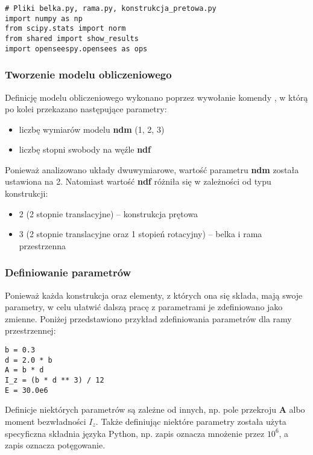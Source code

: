 \begin{lstlisting}
# Pliki belka.py, rama.py, konstrukcja_pretowa.py
import numpy as np
from scipy.stats import norm
from shared import show_results
import openseespy.opensees as ops
\end{lstlisting}

\subsubsection{Tworzenie modelu obliczeniowego}

Definicję modelu obliczeniowego wykonano poprzez wywołanie komendy
, w którą po kolei przekazano następujące parametry:

\begin{itemize}
    \item liczbę wymiarów modelu \textbf{ndm} (1, 2, 3)
    \item liczbę stopni swobody na węźle \textbf{ndf}
\end{itemize}

Ponieważ analizowano układy dwuwymiarowe, wartość parametru \textbf{ndm} została ustawiona na 2.
Natomiast wartość \textbf{ndf} różniła się w zależności od typu konstrukcji:

\begin{itemize}
    \item 2 (2 stopnie translacyjne) – konstrukcja prętowa
    \item 3 (2 stopnie translacyjne oraz 1 stopień rotacyjny) – belka i rama przestrzenna
\end{itemize}

\subsubsection{Definiowanie parametrów}

Ponieważ każda konstrukcja oraz elementy, z których ona się składa, mają swoje parametry, w celu ułatwić dalszą pracę z parametrami
je zdefiniowano jako zmienne.
Poniżej przedstawiono przykład zdefiniowania parametrów dla ramy przestrzennej:

\begin{lstlisting}
b = 0.3
d = 2.0 * b
A = b * d
I_z = (b * d ** 3) / 12
E = 30.0e6
\end{lstlisting}

Definicje niektórych parametrów są zależne od innych, np. pole przekroju \textbf{A} albo moment bezwładności \textbf{$I_z$}.
Także definiując niektóre parametry została użyta specyficzna składnia języka Python, np. zapis  oznacza mnożenie
przez \textbf{$10^6$}, a zapis \ilc{**} oznacza potęgowanie.

